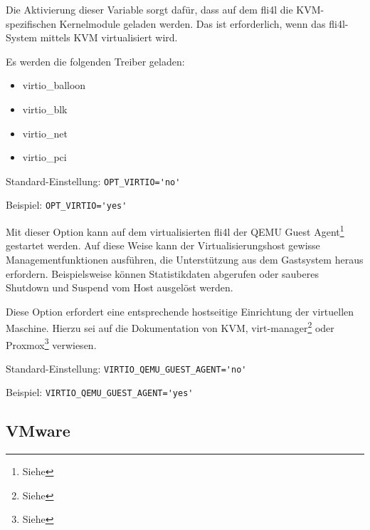 \begin{description}

Die Aktivierung dieser Variable sorgt dafür, dass auf dem fli4l die
KVM-spezifischen Kernelmodule geladen werden. Das ist erforderlich, wenn
das fli4l-System mittels KVM virtualisiert wird.

Es werden die folgenden Treiber geladen:

\begin{itemize}
   \item virtio\_balloon
   \item virtio\_blk
   \item virtio\_net
   \item virtio\_pci
\end{itemize}

Standard-Einstellung: \verb+OPT_VIRTIO='no'+

Beispiel: \verb+OPT_VIRTIO='yes'+


Mit dieser Option kann auf dem virtualisierten fli4l der QEMU Guest
Agent\footnote{Siehe } 
gestartet werden. Auf diese Weise kann der Virtualisierungshost gewisse
Managementfunktionen ausführen, die Unterstützung aus dem Gastsystem
heraus erfordern. Beispielsweise können Statistikdaten abgerufen oder
sauberes Shutdown und Suspend vom Host ausgelöst werden.

Diese Option erfordert eine entsprechende hostseitige Einrichtung der
virtuellen Maschine. Hierzu sei auf die Dokumentation von KVM,
virt-manager\footnote{Siehe } oder
Proxmox\footnote{Siehe } 
verwiesen.

Standard-Einstellung: \verb+VIRTIO_QEMU_GUEST_AGENT='no'+

Beispiel: \verb+VIRTIO_QEMU_GUEST_AGENT='yes'+

\end{description}

\subsection {VMware}

